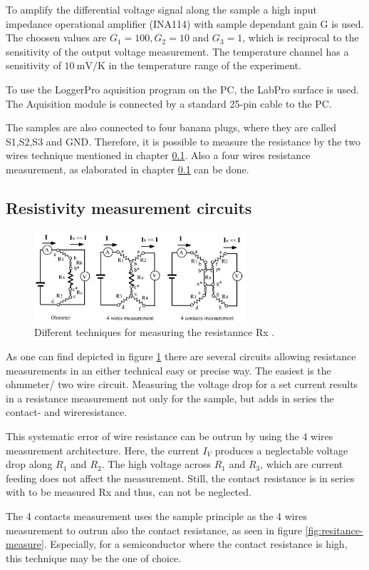 To amplify the differential voltage signal along the sample a high input impedance operational amplifier (INA114) with sample dependant gain G is used.
The choosen values are $G_1 = 100, G_2=10$ and $G_3=1$, which is reciprocal to the sensitivity of the output voltage measurement.
The temperature channel has a sensitivity of $\SI{10}{\milli\volt\per\kelvin}$ in the temperature range of the experiment.

To use the LoggerPro aquisition program on the PC, the LabPro surface is used. 
The Aquisition module is connected by a standard 25-pin cable to the PC.

The samples are also connected to four banana plugs, where they are called S1,S2,S3 and GND.
Therefore, it is possible to measure the resistance by the two wires technique mentioned in chapter \ref{sec:R-measurement}.
Also a four wires resistance measurement, as elaborated in chapter \ref{sec:R-measurement} can be done.

\subsection{Resistivity measurement circuits}
\label{sec:R-measurement}

\begin{figure}
  \centering
  \includegraphics[width=0.7\textwidth]{graphics/r-measure.png}
  \caption[width=0.7\textwidth]{Different techniques for measuring the resistannce Rx \cite{instruction}.}
  \label{fig:resistance-measure}
\end{figure}

As one can find depicted in figure \ref{fig:resistance-measure} there are several circuits allowing resistance measurements in an either technical easy or precise way.
The easiest is the ohmmeter/ two wire circuit. Measuring the voltage drop for a set current results in a resistance measurement not only for the sample, but adds in series the contact- and wireresistance.
  
This systematic error of wire resistance can be outrun by using the 4 wires measurement architecture.
Here, the current $I_V$ produces a neglectable voltage drop along $R_1$ and $R_2$.
The high voltage across $R_1$ and $R_3$, which are current feeding does not affect the measurement.
Still, the contact resistance is in series with to be measured Rx and thus, can not be neglected.

The 4 contacts measurement uses the sample principle as the 4 wires measurement to outrun also the contact resistance, as seen in figure \ref{fig:resitance-measure}.
Especially, for a semiconductor where the contact resistance is high, this technique may be the one of choice.


